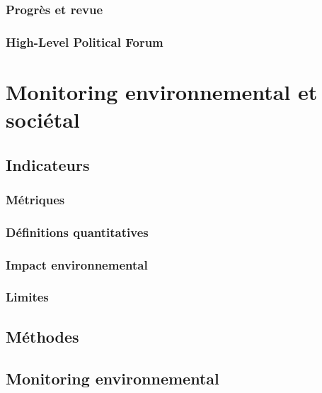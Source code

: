 \documentclass[10pt, conference, compsocconf]{llncs}
\begin{document}
		\subsubsection{Progrès et revue}
		\subsubsection{High-Level Political Forum}

\section{Monitoring environnemental et sociétal}
	\subsection{Indicateurs}
		\subsubsection{Métriques}
		\subsubsection{Définitions quantitatives}
		\subsubsection{Impact environnemental}			
		\subsubsection{Limites}
	\subsection{Méthodes}

\subsection{Monitoring environnemental}
\end{document}

